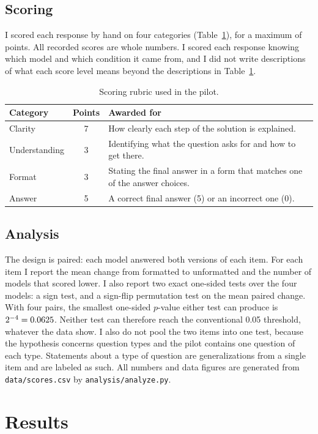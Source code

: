 \documentclass[11pt]{article}
\begin{document}
\subsection{Scoring}
I scored each response by hand on four categories (Table~\ref{tab:rubric}), for a maximum of \TotalMax{} points. All recorded scores are whole numbers. I scored each response knowing which model and which condition it came from, and I did not write descriptions of what each score level means beyond the descriptions in Table~\ref{tab:rubric}.

\begin{table}[t]
\centering\small
\caption{Scoring rubric used in the pilot.}
\label{tab:rubric}
\begin{tabularx}{\linewidth}{@{}l c X@{}}
\toprule
Category & Points & Awarded for \\
\midrule
Clarity & 7 & How clearly each step of the solution is explained. \\
Understanding & 3 & Identifying what the question asks for and how to get there. \\
Format & 3 & Stating the final answer in a form that matches one of the answer choices. \\
Answer & 5 & A correct final answer (5) or an incorrect one (0). \\
\bottomrule
\end{tabularx}
\end{table}

\subsection{Analysis}
The design is paired: each model answered both versions of each item. For each item I report the mean change from formatted to unformatted and the number of models that scored lower. I also report two exact one-sided tests over the four models: a sign test, and a sign-flip permutation test on the mean paired change. With four pairs, the smallest one-sided $p$-value either test can produce is $2^{-4} = 0.0625$. Neither test can therefore reach the conventional 0.05 threshold, whatever the data show. I also do not pool the two items into one test, because the hypothesis concerns question types and the pilot contains one question of each type. Statements about a type of question are generalizations from a single item and are labeled as such. All numbers and data figures are generated from \texttt{data/scores.csv} by \texttt{analysis/analyze.py}.

\section{Results}
\label{sec:results}
\end{document}
